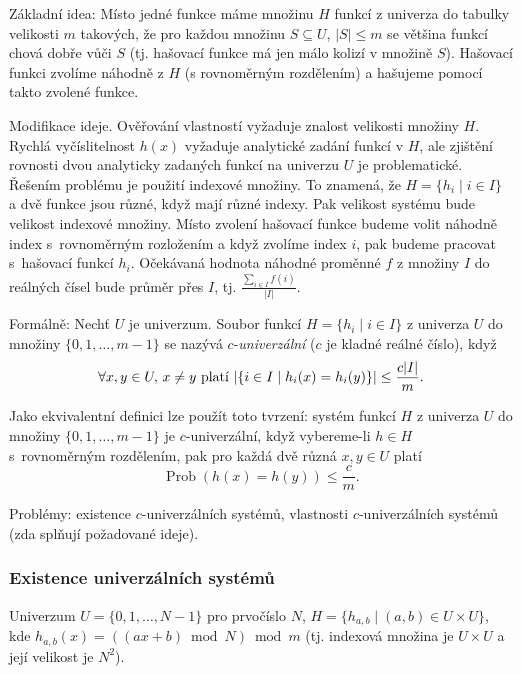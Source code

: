 \documentclass[a4paper,12pt]{article}
\DeclareMathOperator*{\Prob}{Prob}
\begin{document}
Základní idea: Místo jedné funkce máme 
množinu $H$ funkcí z univerza do tabulky velikosti $m$ 
takových, že pro každou množinu $S\subseteq U$, $|S|\le 
m$ se 
většina funkcí chová dobře vůči $S$ (tj. hašovací funkce má jen málo kolizí v množině $S$). 
Hašovací funkci 
zvolíme náhodně z $H$ (s rovnoměrným rozdělením) a hašujeme  
pomocí takto zvo\-lené funkce. 

Modifikace ideje. Ověřování vlastností vyžaduje 
znalost velikosti množiny $H$. Rychlá vyčíslitelnost $
h(x)$ 
vyžaduje ana\-lytické zadání funkcí v $H$, ale zjištění rovnosti 
dvou analy\-ticky zadaných funkcí na univerzu $U$ je 
problematické. Řešením problému je použití indexové množiny. 
To znamená, že $H=\{h_i\mid i\in I\}$ a dvě funkce jsou různé, 
když mají různé indexy. Pak velikost systému bude 
velikost indexové množiny. Místo zvolení hašovací funkce 
budeme volit náhodně index s~rovnoměrným rozložením a když 
zvolíme index $i$, pak budeme pracovat s~hašovací funkcí $
h_i$. 
Očekávaná hodnota náhodné proměnné $f$ z množiny $
I$ do 
reálných čísel bude průměr přes $I$, tj. $\frac {
\sum_{i\in I}f(i)}{|I|}$.

Formálně: Nechť  $U$ je univerzum. Soubor  
funkcí $H=\{h_i\mid i\in I\}$ z univerza $U$ do množiny $\{
0,1,\dots,m-1\}$ se 
nazývá $c$-\emph{univerzální} ($c$ je kladné reálné číslo), 
když 
$$\forall x,y\in U,\,x\ne y\text{\rm\ platí }|\{i\in I\mid h_
i(x)=h_i(y)\}|\le\frac {c|I|}m.$$

Jako ekvivalentní definici lze použít toto tvrzení: systém funkcí $
H$ z univerza $U$ do množiny $\{0,1,\dots,m-1\}$ je $c$-univerzální,
když vybereme-li $h\in H$ s~rovnoměrným rozděle\-ním, pak pro 
každá dvě různá $x,y\in U$ platí 
$$\Prob(h(x)=h(y))\le\frac cm.$$

Problémy: existence $c$-univerzálních 
systémů, \newline 
vlastnosti $c$-univerzálních systémů (zda splňují 
požadované ide\-je).

\subsubsection{Existence univerzálních systémů}

Univerzum $U=\{0,1,\dots,N-1\}$ pro prvočíslo $N$,\newline 
$H=\{h_{a,b}\mid (a,b)\in U\times U\}$,\newline 
kde $h_{a,b}(x)=((ax+b)\bmod N)\bmod m$\newline 
(tj. indexová množina je $U\times U$ a její velikost je $
N^2$).
\end{document}
